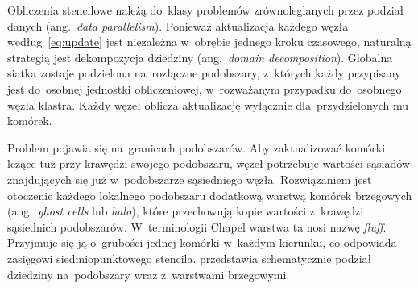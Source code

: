 Obliczenia stencilowe należą do~klasy problemów zrównoleglanych przez podział
danych (ang.\ \emph{data parallelism}). Ponieważ aktualizacja
każdego węzła według~\eqref{eq:update} jest niezależna w~obrębie jednego kroku
czasowego, naturalną strategią jest dekompozycja dziedziny (ang.\ \emph{domain
decomposition}). Globalna siatka zostaje podzielona na~rozłączne podobszary,
z~których każdy przypisany jest do~osobnej jednostki obliczeniowej, w~rozważanym
przypadku do~osobnego węzła klastra. Każdy węzeł oblicza aktualizację wyłącznie
dla~przydzielonych mu komórek.

Problem pojawia się na~granicach podobszarów. Aby zaktualizować komórki leżące
tuż przy krawędzi swojego podobszaru, węzeł potrzebuje wartości sąsiadów
znajdujących się już w~podobszarze sąsiedniego węzła. Rozwiązaniem jest
otoczenie każdego lokalnego podobszaru dodatkową warstwą komórek brzegowych
(ang.\ \emph{ghost cells} lub \emph{halo}), które przechowują kopie wartości
z~krawędzi sąsiednich podobszarów. W~terminologii Chapel warstwa ta nosi nazwę
\emph{fluff}. Przyjmuje się ją o~grubości jednej komórki w~każdym kierunku, co odpowiada
zasięgowi siedmiopunktowego stencila.  przedstawia schematycznie podział
dziedziny na~podobszary wraz z~warstwami brzegowymi.

